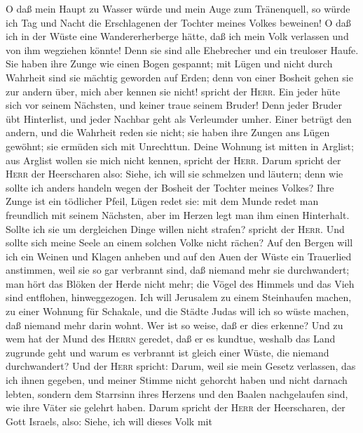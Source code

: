 O daß mein Haupt zu Wasser würde und mein Auge zum
Tränenquell, so würde ich Tag und Nacht die Erschlagenen der Tochter
meines Volkes beweinen!  O daß ich in der Wüste eine
Wandererherberge hätte, daß ich mein Volk verlassen und von ihm
wegziehen könnte! Denn sie sind alle Ehebrecher und ein treuloser Haufe.
 Sie haben ihre Zunge wie einen Bogen gespannt; mit Lügen
und nicht durch Wahrheit sind sie mächtig geworden auf Erden; denn von
einer Bosheit gehen sie zur andern über, mich aber kennen sie nicht!
spricht der \textsc{Herr}.  Ein jeder hüte sich vor seinem
Nächsten, und keiner traue seinem Bruder! Denn jeder Bruder übt
Hinterlist, und jeder Nachbar geht als Verleumder umher. 
Einer betrügt den andern, und die Wahrheit reden sie nicht; sie haben
ihre Zungen ans Lügen gewöhnt; sie ermüden sich mit Unrechttun.
 Deine Wohnung ist mitten in Arglist; aus Arglist wollen
sie mich nicht kennen, spricht der \textsc{Herr}.  Darum
spricht der \textsc{Herr} der Heerscharen also: Siehe, ich will sie
schmelzen und läutern; denn wie sollte ich anders handeln wegen der
Bosheit der Tochter meines Volkes?  Ihre Zunge ist ein
tödlicher Pfeil, Lügen redet sie: mit dem Munde redet man freundlich mit
seinem Nächsten, aber im Herzen legt man ihm einen Hinterhalt.
 Sollte ich sie um dergleichen Dinge willen nicht strafen?
spricht der \textsc{Herr}. Und sollte sich meine Seele an einem solchen
Volke nicht rächen?  Auf den Bergen will ich ein Weinen
und Klagen anheben und auf den Auen der Wüste ein Trauerlied anstimmen,
weil sie so gar verbrannt sind, daß niemand mehr sie durchwandert; man
hört das Blöken der Herde nicht mehr; die Vögel des Himmels und das Vieh
sind entflohen, hinweggezogen.  Ich will Jerusalem zu
einem Steinhaufen machen, zu einer Wohnung für Schakale, und die Städte
Judas will ich so wüste machen, daß niemand mehr darin wohnt.
 Wer ist so weise, daß er dies erkenne? Und zu wem hat
der Mund des \textsc{Herrn} geredet, daß er es kundtue, weshalb das Land
zugrunde geht und warum es verbrannt ist gleich einer Wüste, die niemand
durchwandert?  Und der \textsc{Herr} spricht: Darum, weil
sie mein Gesetz verlassen, das ich ihnen gegeben, und meiner Stimme
nicht gehorcht haben und nicht darnach lebten,  sondern
dem Starrsinn ihres Herzens und den Baalen nachgelaufen sind, wie ihre
Väter sie gelehrt haben.  Darum spricht der \textsc{Herr}
der Heerscharen, der Gott Israels, also: Siehe, ich will dieses Volk mit
